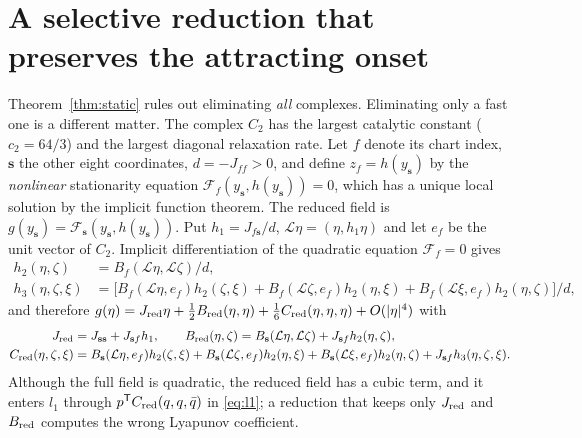 \documentclass[11pt,a4paper]{article}
\theoremstyle{plain}
\theoremstyle{definition}
\theoremstyle{remark}
\newcommand{\T}{\mathsf T}
\begin{document}
\section{A selective reduction that preserves the attracting onset}\label{sec:reduction}
Theorem~\ref{thm:static} rules out eliminating \emph{all} complexes. Eliminating only a fast one is a different matter. The complex $C_2$ has the largest catalytic constant ($c_2=64/3$) and the largest diagonal relaxation rate. Let $f$ denote its chart index, $\mathbf s$ the other eight coordinates, $d=-J_{ff}>0$, and define $z_f=h(y_{\mathbf s})$ by the \emph{nonlinear} stationarity equation $\mathcal F_f(y_{\mathbf s},h(y_{\mathbf s}))=0$, which has a unique local solution by the implicit function theorem. The reduced field is $g(y_{\mathbf s})=\mathcal F_{\mathbf s}(y_{\mathbf s},h(y_{\mathbf s}))$. Put $h_1=J_{f\mathbf s}/d$, $\mathcal L\eta=(\eta,h_1\eta)$ and let $e_f$ be the unit vector of $C_2$. Implicit differentiation of the quadratic equation $\mathcal F_f=0$ gives
\begin{align}
 h_2(\eta,\zeta)&=B_f(\mathcal L\eta,\mathcal L\zeta)/d,\label{eq:h2}\\
 h_3(\eta,\zeta,\xi)&=\bigl[B_f(\mathcal L\eta,e_f)h_2(\zeta,\xi)+B_f(\mathcal L\zeta,e_f)h_2(\eta,\xi)+B_f(\mathcal L\xi,e_f)h_2(\eta,\zeta)\bigr]/d,\label{eq:h3}
\end{align}
and therefore $g(\eta)=J_{\rm red}\eta+\tfrac12B_{\rm red}(\eta,\eta)+\tfrac16C_{\rm red}(\eta,\eta,\eta)+O(|\eta|^4)$ with
\begin{equation}\label{eq:red}
\begin{aligned}
 J_{\rm red}&=J_{\mathbf s\mathbf s}+J_{\mathbf sf}h_1,\qquad
 B_{\rm red}(\eta,\zeta)=B_{\mathbf s}(\mathcal L\eta,\mathcal L\zeta)+J_{\mathbf sf}h_2(\eta,\zeta),\\
 C_{\rm red}(\eta,\zeta,\xi)&=B_{\mathbf s}(\mathcal L\eta,e_f)h_2(\zeta,\xi)+B_{\mathbf s}(\mathcal L\zeta,e_f)h_2(\eta,\xi)+B_{\mathbf s}(\mathcal L\xi,e_f)h_2(\eta,\zeta)+J_{\mathbf sf}h_3(\eta,\zeta,\xi).
\end{aligned}
\end{equation}
Although the full field is quadratic, the reduced field has a cubic term, and it enters $l_1$ through $p^{\T}C_{\rm red}(q,q,\bar q)$ in \eqref{eq:l1}; a reduction that keeps only $J_{\rm red}$ and $B_{\rm red}$ computes the wrong Lyapunov coefficient.
\end{document}
